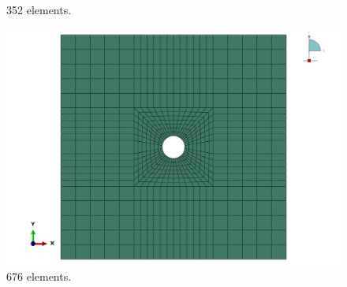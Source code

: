 \documentclass[12pt]{article}
\begin{document}
\begin{figure}[H]
\begin{minipage}{0.24\textwidth}
        \caption*{352 elements.}
    \end{minipage}
    \begin{minipage}{0.24\textwidth}
        \centering
        \includegraphics[width=\textwidth]{images/Mesh4.png}
        \caption*{676 elements.}
    \end{minipage}
\end{figure}
\end{document}
